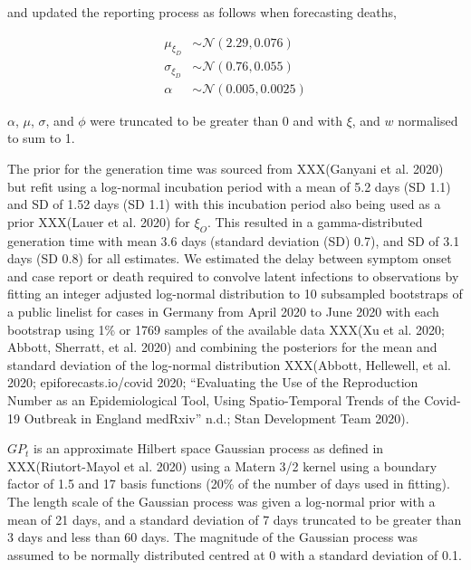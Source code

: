 and updated the reporting process as follows when forecasting deaths,

\begin{align}
    \mu_{\xi_{D}} &\sim \mathcal{N}(2.29, 0.076) \\
    \sigma_{\xi_{D}} &\sim \mathcal{N}(0.76, 0.055) \\
    \alpha &\sim \mathcal{N}(0.005, 0.0025) 
\end{align}

\(\alpha\), \(\mu\), \(\sigma\), and \(\phi\) were truncated to be greater than 0 and with \(\xi\), and \(w\) normalised to sum to 1.

The prior for the generation time was sourced from \cite{ganyaniEstimatingGenerationInterval2020} XXX(Ganyani et al. 2020) but refit using a log-normal incubation period with a mean of 5.2 days (SD 1.1) and SD of 1.52 days (SD 1.1) with this incubation period also being used as a prior \citep{lauerIncubationPeriodCoronavirus2020} XXX(Lauer et al. 2020) for \(\xi_{O}\). This resulted in a gamma-distributed generation time with mean 3.6 days (standard deviation (SD) 0.7), and SD of 3.1 days (SD 0.8) for all estimates. We estimated the delay between symptom onset and case report or death required to convolve latent infections to observations by fitting an integer adjusted log-normal distribution to 10 subsampled bootstraps of a public linelist for cases in Germany from April 2020 to June 2020 with each bootstrap using 1\% or 1769 samples of the available data \citep{kraemer2020epidemiological, covidregionaldata} XXX(Xu et al. 2020; Abbott, Sherratt, et al. 2020) and combining the posteriors for the mean and standard deviation of the log-normal distribution \citep{epinow2, epiforecasts.io/covidCovid19TemporalVariation2020, sherrattExploringSurveillanceData2021, rstan} XXX(Abbott, Hellewell, et al. 2020; epiforecasts.io/covid 2020; {``Evaluating the Use of the Reproduction Number as an Epidemiological Tool, Using Spatio-Temporal Trends of the {Covid-19} Outbreak in {England} \textbar{} {medRxiv}''} n.d.; Stan Development Team 2020).

\(GP_t\) is an approximate Hilbert space Gaussian process as defined in \cite{riutort-mayolPracticalHilbertSpace2022} XXX(Riutort-Mayol et al. 2020) using a Matern 3/2 kernel using a boundary factor of 1.5 and 17 basis functions (20\% of the number of days used in fitting). The length scale of the Gaussian process was given a log-normal prior with a mean of 21 days, and a standard deviation of 7 days truncated to be greater than 3 days and less than 60 days. The magnitude of the Gaussian process was assumed to be normally distributed centred at 0 with a standard deviation of 0.1.

